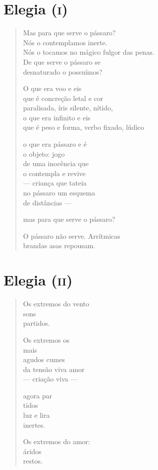 \chapter{Elegia (\textsc{i})}

\begin{verse}
Mas para que serve o pássaro?\\
Nós o contemplamos inerte.\\
Nós o tocamos no mágico fulgor das penas.\\
De que serve o pássaro se\\
desnaturado o possuímos?

O que era voo e eis\\
que é concreção letal e cor\\
paralisada, íris silente, nítido,\\
o que era infinito e eis\\
que é peso e forma, verbo fixado, lúdico

o que era pássaro e é\\
o objeto: jogo\\
de uma inocência que\\
o contempla e revive\\
--- criança que tateia\\
no pássaro um esquema\\
de distâncias ---

mas para que serve o pássaro?

O pássaro não serve. Arrítmicas\\
brandas asas repousam.
\end{verse}

\chapter{Elegia (\textsc{ii})}

\begin{verse}
Os extremos do vento\\
sons\\
partidos.

Os extremos os\\
mais\\
agudos cumes\\
da tensão viva amor\\
--- criação viva ---

agora par\\
\qquad tidos\\
luz e lira\\
inertes.

Os extremos do amor:\\
áridos\\
restos.
\end{verse}

